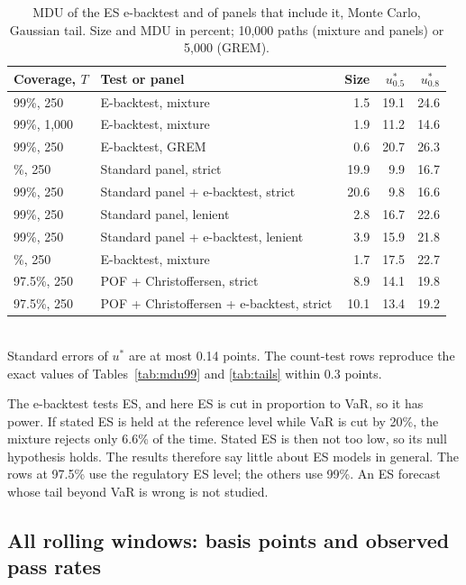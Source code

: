 \documentclass[11pt]{article}
\begin{document}
\begin{table}[tbp]
\caption{MDU of the ES e-backtest and of panels that include it, Monte Carlo, Gaussian tail. Size and MDU in percent; 10,000 paths (mixture and panels) or 5,000 (GREM).}
\label{tab:ebt}
\small
\centering
\begin{tabular}{llrrr}
\toprule
Coverage, $T$ & Test or panel & Size & $u^*_{0.5}$ & $u^*_{0.8}$ \\
\midrule
99\%, 250 & E-backtest, mixture & 1.5 & 19.1 & 24.6 \\
99\%, 1,000 & E-backtest, mixture & 1.9 & 11.2 & 14.6 \\
99\%, 250 & E-backtest, GREM & 0.6 & 20.7 & 26.3 \\
\addlinespace
99\%, 250 & Standard panel, strict & 19.9 & 9.9 & 16.7 \\
99\%, 250 & Standard panel + e-backtest, strict & 20.6 & 9.8 & 16.6 \\
99\%, 250 & Standard panel, lenient & 2.8 & 16.7 & 22.6 \\
99\%, 250 & Standard panel + e-backtest, lenient & 3.9 & 15.9 & 21.8 \\
\addlinespace
97.5\%, 250 & E-backtest, mixture & 1.7 & 17.5 & 22.7 \\
97.5\%, 250 & POF + Christoffersen, strict & 8.9 & 14.1 & 19.8 \\
97.5\%, 250 & POF + Christoffersen + e-backtest, strict & 10.1 & 13.4 & 19.2 \\
\bottomrule
\end{tabular}
\\[2pt]
\footnotesize Standard errors of $u^*$ are at most 0.14 points. The count-test rows reproduce the exact values of Tables~\ref{tab:mdu99} and \ref{tab:tails} within 0.3 points.
\end{table}

The e-backtest tests ES, and here ES is cut
in proportion to VaR, so it has power. If stated ES is held at the reference
level while VaR is cut by 20\%, the mixture rejects only 6.6\% of the time.
Stated ES is then not too low, so its null hypothesis holds. The
results therefore say little about ES models in general. The rows at 97.5\% use
the regulatory ES level; the others use 99\%. An ES forecast whose tail beyond
VaR is wrong is not studied.

\subsection{All rolling windows: basis points and observed pass rates}
\end{document}
